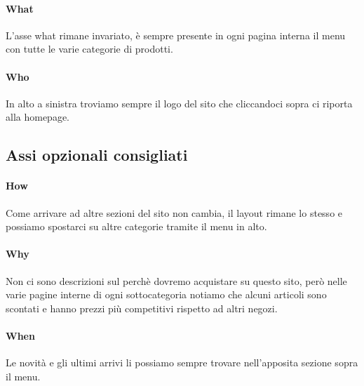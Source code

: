 \documentclass[12pt]{article}
\begin{document}
	\paragraph{What} L'asse what rimane invariato, è sempre presente in ogni pagina interna il menu con tutte le varie categorie di prodotti.
	\paragraph{Who} In alto a sinistra troviamo sempre il logo del sito che cliccandoci sopra ci riporta alla homepage.
	\\
	\subsection{Assi opzionali consigliati}
	\vspace{0.5cm}
	\paragraph{How} Come arrivare ad altre sezioni del sito non cambia, il layout rimane lo stesso e possiamo spostarci su altre categorie tramite il menu in alto.
	\paragraph{Why} Non ci sono descrizioni sul perchè dovremo acquistare su questo sito, però nelle varie pagine interne di ogni sottocategoria notiamo che alcuni articoli sono scontati e hanno prezzi più competitivi rispetto ad altri negozi.
	\paragraph{When} Le novità e gli ultimi arrivi li possiamo sempre trovare nell'apposita sezione sopra il menu.
	\newpage
\end{document}
